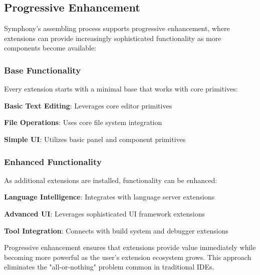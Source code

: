 \subsection*{Progressive Enhancement}

Symphony's assembling process supports progressive enhancement, where extensions can provide increasingly sophisticated functionality as more components become available:

\subsubsection*{Base Functionality}

Every extension starts with a minimal base that works with core primitives:

\begin{compactlist}
    \item \textbf{Basic Text Editing}: Leverages core editor primitives
    \item \textbf{File Operations}: Uses core file system integration
    \item \textbf{Simple UI}: Utilizes basic panel and component primitives
\end{compactlist}

\subsubsection*{Enhanced Functionality}

As additional extensions are installed, functionality can be enhanced:

\begin{compactlist}
    \item \textbf{Language Intelligence}: Integrates with language server extensions
    \item \textbf{Advanced UI}: Leverages sophisticated UI framework extensions
    \item \textbf{Tool Integration}: Connects with build system and debugger extensions
\end{compactlist}

\begin{successbox}
Progressive enhancement ensures that extensions provide value immediately while becoming more powerful as the user's extension ecosystem grows. This approach eliminates the "all-or-nothing" problem common in traditional IDEs.
\end{successbox}

